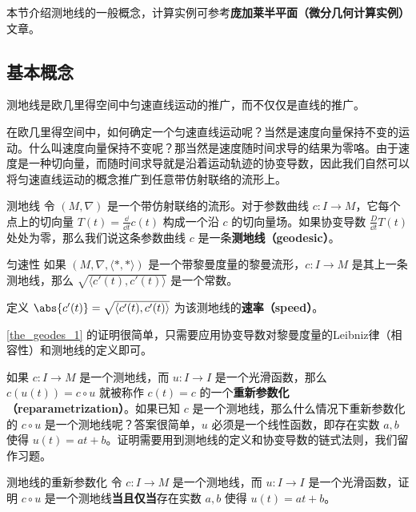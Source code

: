 

本节介绍测地线的一般概念，计算实例可参考\textbf{庞加莱半平面（微分几何计算实例）}文章。

\subsection{基本概念}

测地线是欧几里得空间中匀速直线运动的推广，而不仅仅是直线的推广。

在欧几里得空间中，如何确定一个匀速直线运动呢？当然是速度向量保持不变的运动。什么叫速度向量保持不变呢？那当然是速度随时间求导的结果为零咯。由于速度是一种切向量，而随时间求导就是沿着运动轨迹的协变导数，因此我们自然可以将匀速直线运动的概念推广到任意带仿射联络的流形上。

\begin{definition}{测地线}
令 $(M, \nabla)$ 是一个带仿射联络的流形。对于参数曲线 $c:I\to M$，它每个点上的切向量 $T(t)=\frac{\dd}{\dd t}c(t)$ 构成一个沿 $c$ 的切向量场。如果协变导数 $\frac{D}{\dd t}T(t)$ 处处为零，那么我们说这条参数曲线 $c$ 是一条\textbf{测地线（geodesic）}。
\end{definition}

\begin{theorem}{匀速性}\label{the_geodes_1}
如果 $(M, \nabla,  \langle *, * \rangle )$ 是一个带黎曼度量的黎曼流形，$c:I\to M$ 是其上一条测地线，那么 $\sqrt{ \langle c'(t), c'(t) \rangle }$ 是一个常数。

定义 $\abs{c'(t)}=\sqrt{ \langle c'(t), c'(t) \rangle }$ 为该测地线的\textbf{速率（speed）}。
\end{theorem}

\autoref{the_geodes_1} 的证明很简单，只需要应用协变导数对黎曼度量的Leibniz律（相容性）和测地线的定义即可。



如果 $c:I\to M$ 是一个测地线，而 $u:I\to I$ 是一个光滑函数，那么 $c(u(t))=c\circ u$ 就被称作 $c(t)=c$ 的一个\textbf{重新参数化（reparametrization）}。如果已知 $c$ 是一个测地线，那么什么情况下重新参数化的 $c\circ u$ 是一个测地线呢？答案很简单，$u$ 必须是一个线性函数，即存在实数 $a, b$ 使得 $u(t)=at+b$。证明需要用到测地线的定义和协变导数的链式法则，我们留作习题。

\begin{exercise}{测地线的重新参数化}
令 $c:I\to M$ 是一个测地线，而 $u:I\to I$ 是一个光滑函数，证明 $c\circ u$ 是一个测地线\textbf{当且仅当}存在实数 $a, b$ 使得 $u(t)=at+b$。
\end{exercise}

